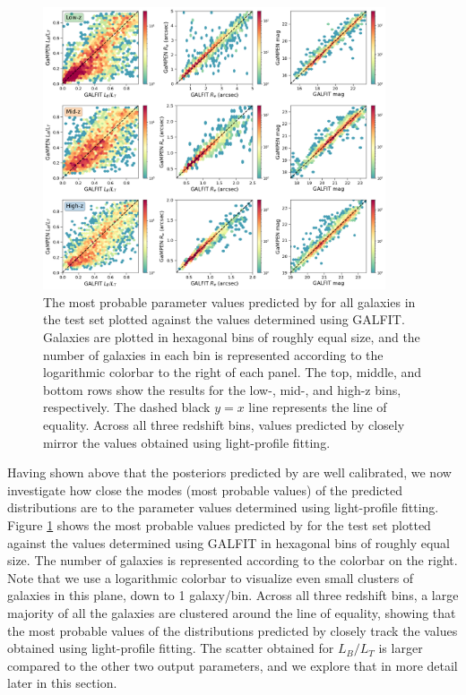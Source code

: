 \begin{figure}[htb]
    \centering
    \includegraphics[width = 0.9\textwidth]{pred_true_all_z.png}
    \caption{The most probable parameter values predicted by \gampen{} for all galaxies in the test set plotted against the values determined using GALFIT. Galaxies are plotted in hexagonal bins of roughly equal size, and the number of galaxies in each bin is represented according to the logarithmic colorbar to the right of each panel. The top, middle, and bottom rows show the results for the low-, mid-, and high-z bins, respectively. The dashed black $y=x$ line represents the line of equality. Across all three redshift bins, values predicted by \gampen{} closely mirror the values obtained using light-profile fitting.}
    \label{fig_c3:pred_true_all_z}
\end{figure}

Having shown above that the posteriors predicted by \gampen{} are well calibrated, we now investigate how close the modes (most probable values) of the predicted distributions are to the parameter values determined using light-profile fitting. Figure \ref{fig_c3:pred_true_all_z} shows the most probable values predicted by \gampen{} for the test set plotted against the values determined using GALFIT in hexagonal bins of roughly equal size. The number of galaxies is represented according to the colorbar on the right. Note that we use a logarithmic colorbar to visualize even small clusters of galaxies in this plane, down to 1 galaxy/bin. Across all three redshift bins, a large majority of all the galaxies are clustered around the line of equality, showing that the most probable values of the distributions predicted by \gampen{} closely track the values obtained using light-profile fitting. The scatter obtained for $L_B/L_T$ is larger compared to the other two output parameters, and we explore that in more detail later in this section.

